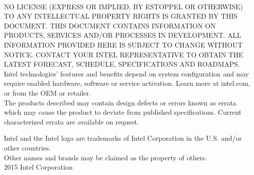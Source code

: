 \newpage

\vspace*{5.0cm}
 \\ 

{\footnotesize

\noindent NO LICENSE (EXPRESS OR IMPLIED, BY ESTOPPEL OR OTHERWISE) TO ANY INTELLECTUAL
PROPERTY RIGHTS IS GRANTED BY THIS DOCUMENT. THIS DOCUMENT CONTAINS INFORMATION
ON PRODUCTS, SERVICES AND/OR PROCESSES IN DEVELOPMENT.  ALL INFORMATION
PROVIDED HERE IS SUBJECT TO CHANGE WITHOUT NOTICE. CONTACT YOUR INTEL
REPRESENTATIVE TO OBTAIN THE LATEST FORECAST, SCHEDULE, SPECIFICATIONS AND
ROADMAPS. \\

\noindent Intel technologies’ features and benefits depend on system configuration and may
require enabled hardware, software or service activation. Learn more at
intel.com, or from the OEM or retailer.  \\

\noindent The products described may contain design defects or errors known as errata
which may cause the product to deviate from published specifications. Current
characterized errata are available on request.


\noindent Intel and the Intel logo are trademarks of Intel Corporation in the U.S. and/or
other countries. \\

\noindent *Other names and brands may be claimed as the property of others.  \\

\noindent {\small\copyright} 2015 Intel Corporation

}
